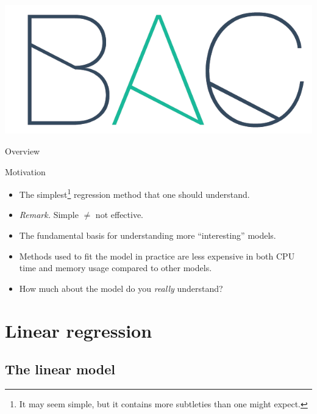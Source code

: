 \documentclass{beamer}
\title[\lecturetitle]{\lecturetitle}
\author[Derek Huang (BAC Advanced Team)]{Derek Huang}
\institute{BAC Advanced Team}
\date{February 27, 2021}
\numberwithin{equation}{section}
\begin{document}
\begin{frame}
    \titlepage
    \centering
    \includegraphics[scale = 0.1]{../bac_logo1.png}
\end{frame}

\begin{frame}{Overview}
    \tableofcontents
\end{frame}

\begin{frame}{Motivation}
    \begin{itemize}
        \item
        The simplest\footnote{
            It may seem simple, but it contains more subtleties than one
            might expect.
        } regression method that one should understand.

        \item
        \textit{Remark.} Simple $ \ne $ not effective.

        \item
        The fundamental basis for understanding more ``interesting'' models.

        \item
        Methods used to fit the model in practice are less expensive in both
        CPU time and memory usage compared to other models.

        \item
        How much about the model do you \textit{really} understand?
    \end{itemize}
\end{frame}

\section{Linear regression}

\subsection{The linear model}
\end{document}
